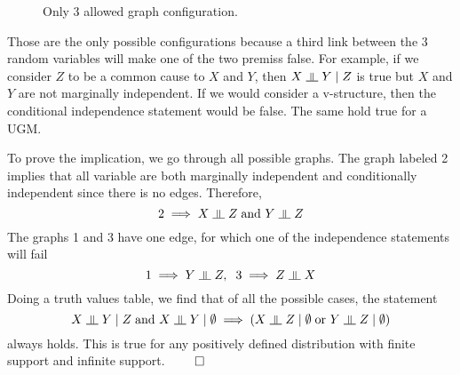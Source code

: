 \documentclass{article}
\numberwithin{equation}{section}
\newcommand{\s}{\hspace{0.1cm}}
\newcommand{\indep}{\s \rotatebox[origin=c]{90}{$\models$}\s }
\theoremstyle{named}
\begin{document}
\begin{figure}[H]
        \centering
        
        \caption{Only 3 allowed graph configuration.}
        \label{fig:}
\end{figure}
Those are the only possible configurations because a third link 
between the 3 random variables will make one of the two premiss false. 
For example, if we consider $Z$ to be a common cause to $X$ and $Y$, 
then $X \indep Y \mid Z$ is true but $X$ and $Y$ are not marginally 
independent. If we would consider a v-structure, then the conditional 
independence statement would be false. The same hold true for a UGM.

To prove the implication, we go through all possible graphs. The graph labeled 2
implies that all variable are both marginally independent and 
conditionally independent since there is no edges. Therefore, 
\[
        2 \implies X \indep Z \s \text{and } Y \indep Z 
\]
The graphs 1 and 3 have one edge, for which one of the independence statements 
will fail
\[
        1 \implies Y \indep Z ,\s\s 3 \implies Z \indep X
\]
Doing a truth values table, we find that of all the possible cases, the statement 
\[
         X \indep Y \mid Z \s \text{and } X \indep Y \mid \emptyset
        \implies  (X \indep Z \mid \emptyset \s \text{or } Y \indep Z \mid \emptyset )
\]
always holds. This is true for any positively defined distribution with finite support 
and infinite support. $\qed$
\end{document}
